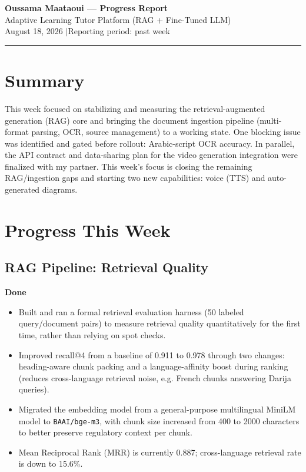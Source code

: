 \documentclass[11pt]{article}
\newcommand{\statusdone}{\textcolor{accent}{\textbf{Done}}}
\begin{document}
\begin{center}
    {\Huge \bfseries \color{accent} Oussama Maataoui --- Progress Report}\\[0.6em]
    {\large \color{muted} Adaptive Learning Tutor Platform (RAG + Fine-Tuned LLM)}\\[0.4em]
    {\normalsize \color{muted} August 18, 2026 \quad$|$\quad Reporting period: past week}
\end{center}

\vspace{1em}
\hrule
\vspace{1.5em}

\section*{Summary}
This week focused on stabilizing and measuring the retrieval-augmented generation (RAG) core and bringing the document ingestion pipeline (multi-format parsing, OCR, source management) to a working state. One blocking issue was identified and gated before rollout: Arabic-script OCR accuracy. In parallel, the API contract and data-sharing plan for the video generation integration were finalized with my partner. This week's focus is closing the remaining RAG/ingestion gaps and starting two new capabilities: voice (TTS) and auto-generated diagrams.

\section{Progress This Week}

\subsection{RAG Pipeline: Retrieval Quality}
\statusdone
\begin{itemize}
    \item Built and ran a formal retrieval evaluation harness (50 labeled query/document pairs) to measure retrieval quality quantitatively for the first time, rather than relying on spot checks.
    \item Improved recall@4 from a baseline of 0.911 to 0.978 through two changes: heading-aware chunk packing and a language-affinity boost during ranking (reduces cross-language retrieval noise, e.g. French chunks answering Darija queries).
    \item Migrated the embedding model from a general-purpose multilingual MiniLM model to \texttt{BAAI/bge-m3}, with chunk size increased from 400 to 2000 characters to better preserve regulatory context per chunk.
    \item Mean Reciprocal Rank (MRR) is currently 0.887; cross-language retrieval rate is down to 15.6\%.
\end{itemize}
\end{document}
